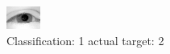 \begin{figure}[h!]
\begin{center}
\includegraphics[width=0.60\columnwidth]{figures/ID2321_class_1_target_2.png}
\end{center}
\caption{ Classification: 1 actual target: 2}
\label{fig:ID2321_class_1_target_2}
\end{figure}
